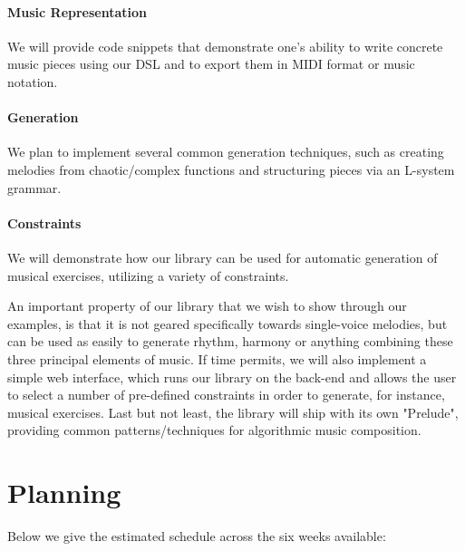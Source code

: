 \documentclass[12pt,a4paper]{article}
\begin{document}
\paragraph{Music Representation} We will provide code snippets that demonstrate one's ability to write concrete music pieces using our DSL and to export them in MIDI format or music notation.
\vspace{-15pt}
\paragraph{Generation} We plan to implement several common generation techniques, such as creating melodies from 
chaotic/complex functions and structuring pieces via an L-system grammar.
\vspace{-15pt}
\paragraph{Constraints} We will demonstrate how our library can be used for automatic generation of musical exercises, utilizing a variety of constraints.
\vspace{5pt}

An important property of our library that we wish to show through our examples, is that it is not geared specifically towards single-voice melodies, but can be used as easily to generate rhythm, harmony or anything combining these three principal elements of music.
If time permits, we will also implement a simple web interface, which runs our library on the back-end and allows the user to select a number of pre-defined constraints in order to generate, for instance, musical exercises.
Last but not least, the library will ship with its own "Prelude", providing common patterns/techniques for algorithmic music composition.

\section{Planning}
Below we give the estimated schedule across the six weeks available:
\vspace{.5cm}

\startchronology
{}
\stopchronology
\vspace{.5cm}



\end{document}
